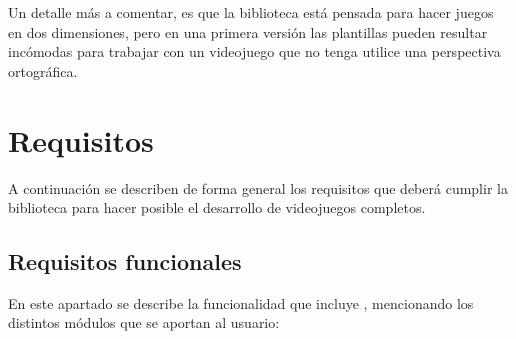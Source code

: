 Un detalle más a comentar, es que la biblioteca está pensada para hacer juegos en dos dimensiones, pero en una primera versión las plantillas pueden resultar incómodas para trabajar con un videojuego que no tenga utilice una perspectiva ortográfica.

\section{Requisitos}

A continuación se describen de forma general los requisitos que deberá cumplir la biblioteca para hacer posible el desarrollo de videojuegos completos.

\subsection{Requisitos funcionales}

En este apartado se describe la funcionalidad que incluye , mencionando los distintos módulos que se aportan al usuario:

